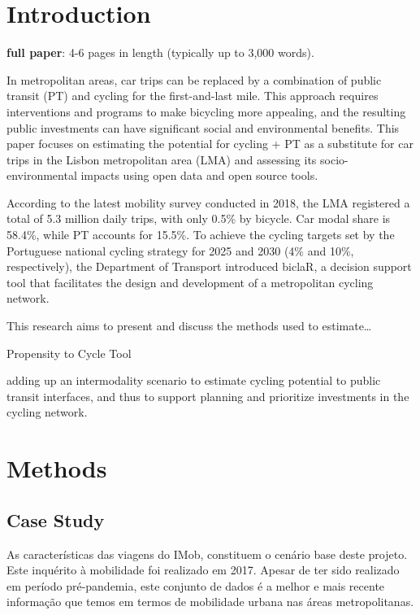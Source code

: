 \documentclass[runningheads]{llncs}
\begin{document}
\hypertarget{introduction}{%
\section{Introduction}\label{introduction}}

\textbf{full paper}: 4-6 pages in length (typically up to 3,000 words).

In metropolitan areas, car trips can be replaced by a combination of
public transit (PT) and cycling for the first-and-last mile. This
approach requires interventions and programs to make bicycling more
appealing, and the resulting public investments can have significant
social and environmental benefits. This paper focuses on estimating the
potential for cycling + PT as a substitute for car trips in the Lisbon
metropolitan area (LMA) and assessing its socio-environmental impacts
using open data and open source tools.

According to the latest mobility survey conducted in 2018, the LMA
registered a total of 5.3 million daily trips, with only 0.5\% by
bicycle. Car modal share is 58.4\%, while PT accounts for 15.5\%. To
achieve the cycling targets set by the Portuguese national cycling
strategy for 2025 and 2030 (4\% and 10\%, respectively), the Department
of Transport introduced biclaR, a decision support tool that facilitates
the design and development of a metropolitan cycling network.

This research aims to present and discuss the methods used to
estimate\ldots{}

Propensity to Cycle Tool

adding up an intermodality scenario to estimate cycling potential to
public transit interfaces, and thus to support planning and prioritize
investments in the cycling network.

\hypertarget{methods}{%
\section{Methods}\label{methods}}

\hypertarget{case-study}{%
\subsection{Case Study}\label{case-study}}

As características das viagens do IMob, constituem o cenário base deste
projeto. Este inquérito à mobilidade foi realizado em 2017. Apesar de
ter sido realizado em período pré-pandemia, este conjunto de dados é a
melhor e mais recente informação que temos em termos de mobilidade
urbana nas áreas metropolitanas.
\end{document}
